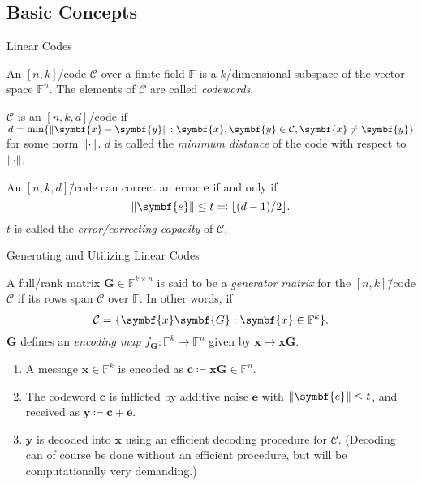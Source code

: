 \documentclass[usepdftitle=false]{beamer}
\renewcommand*{\vec}{\symbf}%
\newcommand*{\mat}{\symbf}%
\newcommand*{\FF}{\ensuremath{\mathbb{F}}}%
\DeclarePairedDelimiter{\floor}{\lfloor}{\rfloor}%
\DeclarePairedDelimiter{\norm}{\lVert}{\rVert}%
\begin{document}
\subsection{Basic Concepts}

\begin{frame}{Linear Codes}
  \begin{definition}
    An \([n, k]\)\=/code \(\mathcal{C}\) over a finite field \(\FF\)
    is a \(k\)\=/dimensional subspace of the vector space \(\FF^n\).
    The elements of \(\mathcal{C}\) are called \emph{codewords}.

    \(\mathcal{C}\) is an \([n, k, d]\)\=/code if
    \(d = \min\{\norm{\vec{x} - \vec{y}} : \vec{x}, \vec{y} \in
    \mathcal{C}, \vec{x} \ne \vec{y}\}\) for some norm
    \(\norm{\cdot}\).  \(d\) is called the \emph{minimum distance} of
    the code with respect to \(\norm{\cdot}\).
  \end{definition}
  An \([n, k, d]\)\=/code can correct an error \(\vec{e}\) if and only
  if \[\norm{\vec{e}} \le t \eqqcolon \floor{(d - 1) / {2}}\text.\]
  \(t\) is called the \emph{error\-/correcting capacity} of
  \(\mathcal{C}\).
\end{frame}

\begin{frame}{Generating and Utilizing Linear Codes}
  \begin{definition}
    A full\-/rank matrix \(\mat{G} \in \FF^{k \times n}\) is said to
    be a \emph{generator matrix} for the \([n, k]\)\=/code
    \(\mathcal{C}\) if its rows span \(\mathcal{C}\) over \(\FF\).  In
    other words, if
    \[
      \mathcal{C} = \{\vec{x} \mat{G} : \vec{x} \in \FF^k\}\text.
    \]
    \(\mat{G}\) defines an \emph{encoding map}
    \(f_{\mat{G}}\colon \FF^k \to \FF^n\) given by
    \(\vec{x} \mapsto \vec{x} \vec{G}\).
  \end{definition}
  \begin{enumerate}
  \item A message \(\vec{x} \in \FF^k\) is encoded as
    \(\vec{c} \coloneqq \vec{x} \mat{G} \in \FF^n\).
  \item The codeword \(\vec{c}\) is inflicted by additive noise
    \(\vec{e}\) with \(\norm{\vec{e}} \le t\), and received as
    \(\vec{y} \coloneqq \vec{c} + \vec{e}\).
  \item \(\vec{y}\) is decoded into \(\vec{x}\) using an efficient
    decoding procedure for \(\mathcal{C}\).  (Decoding can of course
    be done without an efficient procedure, but will be
    computationally very demanding.)
  \end{enumerate}
\end{frame}
\end{document}
